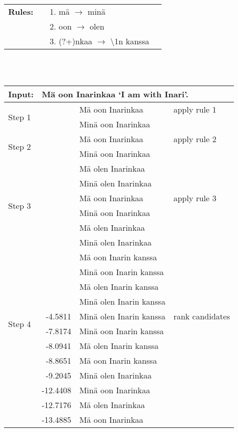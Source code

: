 \documentclass[11pt]{article}
\begin{document}
\begin{table*}
  \centering
  \begin{tabular}{|lrl|l|}
    \hline
    \textbf{Rules:} & & 1. m\"{a} $\rightarrow$ min\"{a} \\
     ~              & & 2. oon $\rightarrow$ olen \\
     ~              & & 3. (?+)nkaa $\rightarrow$ \textbackslash1n kanssa \\
    \hline
  \end{tabular}
~\\
~\\
  \begin{tabular}{|l|r|l|l|}
    \hline
    \textbf{Input:} & \multicolumn{3}{l|}{M\"{a} oon Inarinkaa `I am with Inari'.} \\
    \hline
    \multirow{2}{*}{Step 1} & & M\"{a} oon Inarinkaa & apply rule 1 \\
                            & & Min\"{a} oon Inarinkaa & \\
    \hline
    \multirow{2}{*}{Step 2} & & M\"{a} oon Inarinkaa & apply rule 2 \\
                            &   & Min\"{a} oon Inarinkaa & \\
                            &   & M\"{a} olen Inarinkaa & \\
                            &   & Min\"{a} olen Inarinkaa & \\
    \hline
    \multirow{2}{*}{Step 3} &   & M\"{a} oon Inarinkaa   & apply rule 3\\
                            &   & Min\"{a} oon Inarinkaa  &\\
                            &   & M\"{a} olen Inarinkaa  &\\
                            &   & Min\"{a} olen Inarinkaa  &\\
                            &   & M\"{a} oon Inarin kanssa  &\\
                            &   & Min\"{a} oon Inarin kanssa  &\\
                            &   & M\"{a} olen Inarin kanssa  &\\
                            &   & Min\"{a} olen Inarin kanssa  &\\
    \hline
    \multirow{2}{*}{Step 4} & -4.5811 &  Min\"{a} olen Inarin kanssa & rank candidates \\
                            & -7.8174 &  Min\"{a} oon Inarin kanssa & \\
                            & -8.0941 &  M\"{a} olen Inarin kanssa & \\
                            & -8.8651&  M\"{a} oon Inarin kanssa & \\
                            & -9.2045 &  Min\"{a} olen Inarinkaa & \\
                            & -12.4408 &  Min\"{a} oon Inarinkaa & \\
                            & -12.7176 &  M\"{a} olen Inarinkaa & \\
                            & -13.4885 &  M\"{a} oon Inarinkaa & \\


\end{tabular}
\end{table*}
\end{document}
